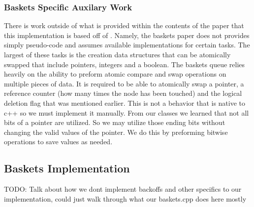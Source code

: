 \documentclass[conference]{IEEEtran}
\begin{document}
\subsubsection{Baskets Specific Auxilary Work}
There is work outside of what is provided within the contents of the paper that this implementation is based off of \cite{baskets}.  Namely, the baskets paper \cite{baskets} does not provides simply pseudo-code and assumes available implementations for certain tasks.  The largest of these tasks is the creation data structures that can be atomically swapped that include pointers, integers and a boolean.  The baskets queue relies heavily on the ability to preform atomic compare and swap operations on multiple pieces of data.  It is required to be able to atomically swap a pointer, a reference counter (how many times the node has been touched) and the logical deletion flag that was mentioned earlier.  This is not a behavior that is native to c++ so we must implement it manually.  From our classes we learned that not all bits of a pointer are utilized.  So we may utilize those ending bits without changing the valid values of the pointer.  We do this by preforming bitwise operations to save values as needed.\break
\subsection{Baskets Implementation}
TODO: Talk about how we dont implement backoffs and other specifics to our implementation, could just walk through what our baskets.cpp does here mostly
\end{document}
